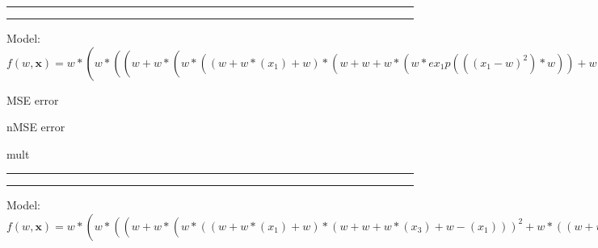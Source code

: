 \documentclass[12pt]{article}
\begin{document}
\hrule
\vspace{1cm}
\hrule
\vspace{1cm}
Model: $f(w,\mathbf{x})=w*(w*((w+w*(w*((w+w*(x_1)+w)*(w+w+w*(w*ex_1p(((x_1-w)^2)*w))+w-(x_1)))^2+w*((w+w*(x_1)+w)*(w+w+w*(w*ex_1p(((x_1-w)^2)*w))+w-(x_1)))+w))*(w*ex_3p(((x_3-w)^2)*w)))^2+w*((w+w*(w*((w+w*(x_1)+w)*(w+w+w*(w*ex_1p(((x_1-w)^2)*w))+w-(x_1)))^2+w*((w+w*(x_1)+w)*(w+w+w*(w*ex_1p(((x_1-w)^2)*w))+w-(x_1)))+w))*(w*ex_3p(((x_3-w)^2)*w)))+w)$

MSE error

nMSE error


\begin{bundle}{mult}\end{bundle}

\hrule
\vspace{1cm}
\hrule
\vspace{1cm}
Model: $f(w,\mathbf{x})=w*(w*((w+w*(w*((w+w*(x_1)+w)*(w+w+w*(x_3)+w-(x_1)))^2+w*((w+w*(x_1)+w)*(w+w+w*(x_3)+w-(x_1)))+w))*(w*ex_3p(((x_3-w)^2)*w)))^2+w*((w+w*(w*((w+w*(x_1)+w)*(w+w+w*(x_3)+w-(x_1)))^2+w*((w+w*(x_1)+w)*(w+w+w*(x_3)+w-(x_1)))+w))*(w*ex_3p(((x_3-w)^2)*w)))+w)$
\end{document}
